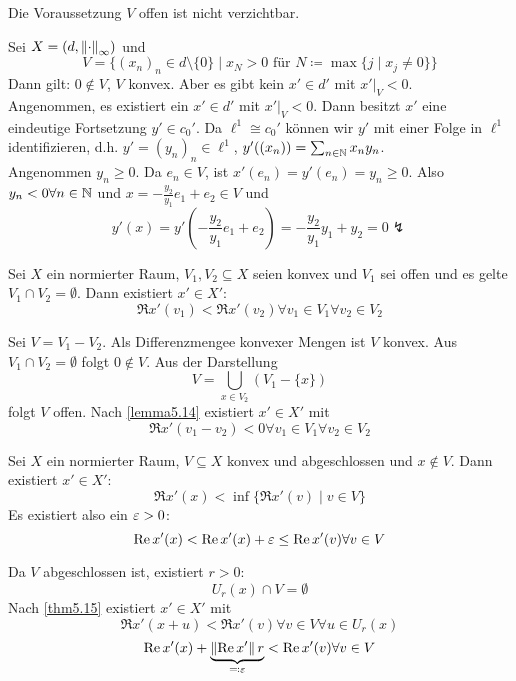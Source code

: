 \newpage
\begin{bemerkung*}
	Die Voraussetzung $ V $ offen ist nicht verzichtbar.
	\begin{beispiel*}
		Sei $ X=(d,\left\|\cdot\right\|_\infty) $ und \[ V=\lbrace (x_n)_n\in d\setminus\lbrace 0\rbrace\mid x_N>0\text{ f\"ur }N\coloneqq\max\lbrace j\mid x_j\neq 0\rbrace\rbrace \]
		Dann gilt: $ 0\notin V $, $ V $ konvex. Aber es gibt kein $ x'\in d' $ mit $ x'|_V<0 $.\\
		Angenommen, es existiert ein $ x'\in d' $ mit $ x'|_V<0 $. Dann besitzt $ x' $ eine eindeutige Fortsetzung $ y'\in c_0' $. Da $ \ell^1\cong c_0' $ k\"onnen wir $ y' $ mit einer Folge in $ \ell^1 $ identifizieren, d.h. $ y'=(y_n)_n\in\ell^1 $, $ y'((x_n))=\sum_{n\in\mathbb{N}}^{} x_ny_n $.\\
		Angenommen $ y_n\geq 0 $. Da $ e_n\in V $, ist $ x'(e_n)=y'(e_n)=y_n\geq 0 $. Also $ y_n<0\forall n\in\mathbb{N} $ und $ x=-\frac{y_2}{y_1}e_1+e_2\in V $ und
		\[ y'(x)=y'\left(-\frac{y_2}{y_1}e_1+e_2\right)=-\frac{y_2}{y_1}y_1+y_2=0\lightning \] 
	\end{beispiel*}
\end{bemerkung*}
\begin{theorem}
	Sei $  X $ ein normierter Raum, $ V_1,V_2\subseteq X $ seien konvex und $ V_1 $ sei offen und es gelte $ V_1\cap V_2=\emptyset $. Dann existiert $ x'\in X' $:
	\[ \Re x'(v_1)<\Re x'(v_2)\forall v_1\in V_1\forall v_2\in V_2 \] 
\end{theorem}
\begin{beweis}
	Sei $ V=V_1-V_2 $. Als Differenzmengee konvexer Mengen ist $ V $ konvex. Aus $ V_1\cap V_2=\emptyset $ folgt $ 0\notin V $. Aus der Darstellung
	\[ V=\bigcup_{x\in V_2}(V_1-\lbrace x\rbrace) \]
	folgt $ V $ offen. Nach \ref{lemma5.14} existiert $ x'\in X' $ mit
	\[ \Re x'(v_1-v_2)<0\forall v_1\in V_1\forall v_2\in V_2 \]
\end{beweis}
\newpage
\begin{theorem}
	Sei $ X $ ein normierter Raum, $ V\subseteq X $ konvex und abgeschlossen und $ x\notin V $. Dann existiert $ x'\in X' $:
	\[ \Re x'(x)<\inf\lbrace \Re x'(v)\mid v\in V\rbrace \]
	Es existiert also ein $ \varepsilon>0 $:
	\[ \operatorname{Re} x'(x)<\operatorname{Re} x'(x)+\varepsilon\leq\operatorname{Re} x'(v)\forall v\in V\]
\end{theorem}
\begin{beweis}
	Da $ V $ abgeschlossen ist, existiert $ r>0 $:
	\[ U_r(x)\cap V=\emptyset \]
	Nach \ref{thm5.15} existiert $ x'\in X' $ mit 
	\[ \Re x'(x+u)<\Re x'(v)\forall v\in V\forall u\in U_r(x) \]
	\[ \operatorname{Re} x'(x)+\underbrace{\left\|\operatorname{Re} x'\right\|r}_{\eqqcolon\varepsilon}<\operatorname{Re} x'(v)\forall v\in V \]
\end{beweis}